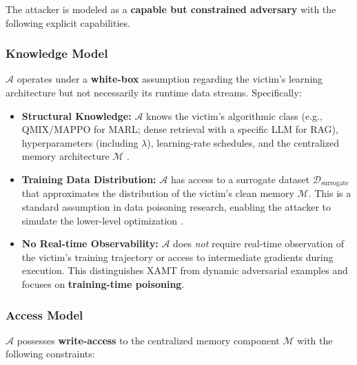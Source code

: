 \documentclass[conference]{IEEEtran}
\begin{document}
The attacker is modeled as a \textbf{capable but constrained adversary} with the following explicit capabilities.

\subsubsection{Knowledge Model}
$\mathcal{A}$ operates under a \textbf{white-box} assumption regarding the victim's learning architecture but not necessarily its runtime data streams. Specifically:

\begin{itemize}
\item \textbf{Structural Knowledge:} $\mathcal{A}$ knows the victim's algorithmic class (e.g., QMIX/MAPPO for MARL; dense retrieval with a specific LLM for RAG), hyperparameters (including $\lambda$), learning-rate schedules, and the centralized memory architecture $\mathcal{M}$ \cite{Ref12, Ref14}.
\item \textbf{Training Data Distribution:} $\mathcal{A}$ has access to a surrogate dataset $\mathcal{D}_{\text{surrogate}}$ that approximates the distribution of the victim's clean memory $\mathcal{M}$. This is a standard assumption in data poisoning research, enabling the attacker to simulate the lower-level optimization \cite{Ref18, Ref19}.
\item \textbf{No Real-time Observability:} $\mathcal{A}$ does \textit{not} require real-time observation of the victim's training trajectory or access to intermediate gradients during execution. This distinguishes XAMT from dynamic adversarial examples and focuses on \textbf{training-time poisoning}.
\end{itemize}

\subsubsection{Access Model}
$\mathcal{A}$ possesses \textbf{write-access} to the centralized memory component $\mathcal{M}$ with the following constraints:
\end{document}
